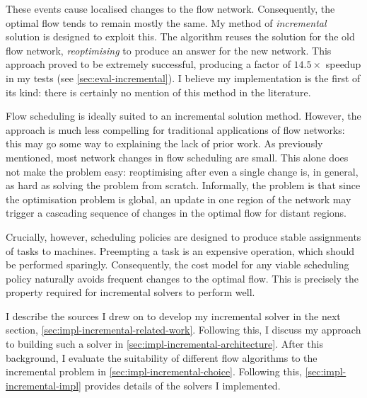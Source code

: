 These events cause localised changes to the flow network. Consequently, the optimal flow tends to remain mostly the same. My method of \emph{incremental} solution is designed to exploit this. The algorithm reuses the solution for the old flow network, \emph{reoptimising} to produce an answer for the new network. This approach proved to be extremely successful, producing a factor of $14.5\times$ speedup in my tests (see \cref{sec:eval-incremental}). I believe my implementation is the first of its kind: there is certainly no mention of this method in the literature.

Flow scheduling is ideally suited to an incremental solution method. However, the approach is much less compelling for traditional applications of flow networks: this may go some way to explaining the lack of prior work. As previously mentioned, most network changes in flow scheduling are small. This alone does not make the problem easy: reoptimising after even a single change is, in general, as hard as solving the problem from scratch\footnotemark. Informally, the problem is that since the optimisation problem is global, an update in one region of the network may trigger a cascading sequence of changes in the optimal flow for distant regions.

Crucially, however, scheduling policies are designed to produce stable assignments of tasks to machines. Preempting a task is an expensive operation, which should be performed sparingly. Consequently, the cost model for any viable scheduling policy naturally avoids frequent changes to the optimal flow. This is precisely the property required for incremental solvers to perform well.

I describe the sources I drew on to develop my incremental solver in the next section, \cref{sec:impl-incremental-related-work}. Following this, I discuss my approach to building such a solver in \cref{sec:impl-incremental-architecture}. After this background, I evaluate the suitability of different flow algorithms to the incremental problem in \cref{sec:impl-incremental-choice}. Following this, \cref{sec:impl-incremental-impl} provides details of the solvers I implemented.

